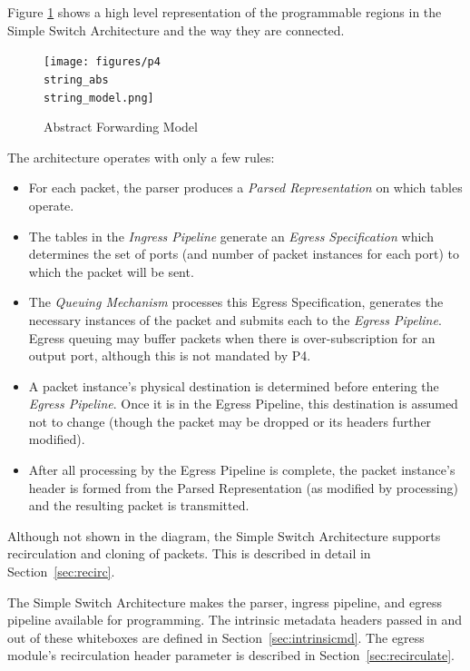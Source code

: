 \documentclass[12pt]{article}
\begin{document}
Figure \ref{fig:abstractmodel} shows a high level representation of the
programmable regions in the Simple Switch Architecture and the way they are
connected.

\begin{figure}[h!]
    \centering
    \texttt{[image: figures/p4\\string\_abs\\string\_model.png]}
    \caption{Abstract Forwarding Model}
    \label{fig:abstractmodel}
\end{figure}

The architecture operates with only a few rules:

\begin{itemize}
\item
For each packet, the parser produces a \textit{Parsed Representation}
on which \matchaction tables operate.
\item
The \matchaction tables in the \textit{Ingress Pipeline} generate an
\textit{Egress Specification }which determines the set of ports (and
number of packet instances for each port) to which the packet will be
sent.
\item
The \textit{Queuing Mechanism} processes this Egress Specification,
generates the necessary instances of the packet and submits each to
the \textit{Egress Pipeline}.  Egress queuing may buffer packets when
there is over-subscription for an output port, although this is not
mandated by P4.
\item
A packet instance's physical destination is determined before entering
the \textit{Egress Pipeline}.  Once it is in the Egress Pipeline, this
destination is assumed not to change (though the packet may be dropped
or its headers further modified).
\item
After all processing by the Egress Pipeline is complete, the packet
instance's header is formed from the Parsed Representation (as
modified by \matchaction processing) and the resulting packet is
transmitted.
\end{itemize}

Although not shown in the diagram, the Simple Switch Architecture supports
recirculation and cloning of packets.  This is described in detail
in Section~\ref{sec:recirc}.


The Simple Switch Architecture makes the parser, ingress pipeline, and egress
pipeline available for programming. The intrinsic metadata headers passed in and
out of these whiteboxes are defined in Section~\ref{sec:intrinsicmd}. The egress
module's recirculation header parameter is described in
Section~\ref{sec:recirculate}.
\end{document}
